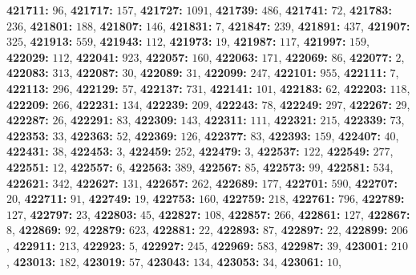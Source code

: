\textsf{\bfseries 421711:} $96$, \textsf{\bfseries 421717:} $157$, \textsf{\bfseries 421727:} $1091$, \textsf{\bfseries 421739:} $486$, \textsf{\bfseries 421741:} $72$, \textsf{\bfseries 421783:} $236$, \textsf{\bfseries 421801:} $188$, \textsf{\bfseries 421807:} $146$, \textsf{\bfseries 421831:} $7$, \textsf{\bfseries 421847:} $239$, \textsf{\bfseries 421891:} $437$, \textsf{\bfseries 421907:} $325$, \textsf{\bfseries 421913:} $559$, \textsf{\bfseries 421943:} $112$, \textsf{\bfseries 421973:} $19$, \textsf{\bfseries 421987:} $117$, \textsf{\bfseries 421997:} $159$, \textsf{\bfseries 422029:} $112$, \textsf{\bfseries 422041:} $923$, \textsf{\bfseries 422057:} $160$, \textsf{\bfseries 422063:} $171$, \textsf{\bfseries 422069:} $86$, \textsf{\bfseries 422077:} $2$, \textsf{\bfseries 422083:} $313$, \textsf{\bfseries 422087:} $30$, \textsf{\bfseries 422089:} $31$, \textsf{\bfseries 422099:} $247$, \textsf{\bfseries 422101:} $955$, \textsf{\bfseries 422111:} $7$, \textsf{\bfseries 422113:} $296$, \textsf{\bfseries 422129:} $57$, \textsf{\bfseries 422137:} $731$, \textsf{\bfseries 422141:} $101$, \textsf{\bfseries 422183:} $62$, \textsf{\bfseries 422203:} $118$, \textsf{\bfseries 422209:} $266$, \textsf{\bfseries 422231:} $134$, \textsf{\bfseries 422239:} $209$, \textsf{\bfseries 422243:} $78$, \textsf{\bfseries 422249:} $297$, \textsf{\bfseries 422267:} $29$, \textsf{\bfseries 422287:} $26$, \textsf{\bfseries 422291:} $83$, \textsf{\bfseries 422309:} $143$, \textsf{\bfseries 422311:} $111$, \textsf{\bfseries 422321:} $215$, \textsf{\bfseries 422339:} $73$, \textsf{\bfseries 422353:} $33$, \textsf{\bfseries 422363:} $52$, \textsf{\bfseries 422369:} $126$, \textsf{\bfseries 422377:} $83$, \textsf{\bfseries 422393:} $159$, \textsf{\bfseries 422407:} $40$, \textsf{\bfseries 422431:} $38$, \textsf{\bfseries 422453:} $3$, \textsf{\bfseries 422459:} $252$, \textsf{\bfseries 422479:} $3$, \textsf{\bfseries 422537:} $122$, \textsf{\bfseries 422549:} $277$, \textsf{\bfseries 422551:} $12$, \textsf{\bfseries 422557:} $6$, \textsf{\bfseries 422563:} $389$, \textsf{\bfseries 422567:} $85$, \textsf{\bfseries 422573:} $99$, \textsf{\bfseries 422581:} $534$, \textsf{\bfseries 422621:} $342$, \textsf{\bfseries 422627:} $131$, \textsf{\bfseries 422657:} $262$, \textsf{\bfseries 422689:} $177$, \textsf{\bfseries 422701:} $590$, \textsf{\bfseries 422707:} $20$, \textsf{\bfseries 422711:} $91$, \textsf{\bfseries 422749:} $19$, \textsf{\bfseries 422753:} $160$, \textsf{\bfseries 422759:} $218$, \textsf{\bfseries 422761:} $796$, \textsf{\bfseries 422789:} $127$, \textsf{\bfseries 422797:} $23$, \textsf{\bfseries 422803:} $45$, \textsf{\bfseries 422827:} $108$, \textsf{\bfseries 422857:} $266$, \textsf{\bfseries 422861:} $127$, \textsf{\bfseries 422867:} $8$, \textsf{\bfseries 422869:} $92$, \textsf{\bfseries 422879:} $623$, \textsf{\bfseries 422881:} $22$, \textsf{\bfseries 422893:} $87$, \textsf{\bfseries 422897:} $22$, \textsf{\bfseries 422899:} $206$, \textsf{\bfseries 422911:} $213$, \textsf{\bfseries 422923:} $5$, \textsf{\bfseries 422927:} $245$, \textsf{\bfseries 422969:} $583$, \textsf{\bfseries 422987:} $39$, \textsf{\bfseries 423001:} $210$, \textsf{\bfseries 423013:} $182$, \textsf{\bfseries 423019:} $57$, \textsf{\bfseries 423043:} $134$, \textsf{\bfseries 423053:} $34$, \textsf{\bfseries 423061:} $10$, 
